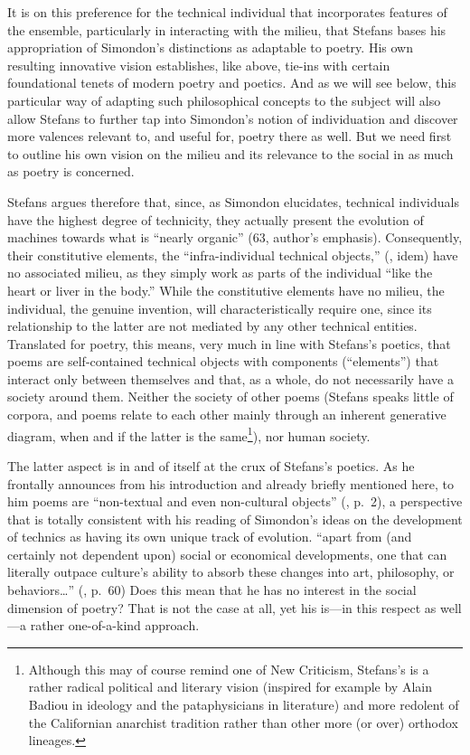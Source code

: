 It is on this preference for the technical individual that incorporates
features of the ensemble, particularly in interacting with the milieu,
that Stefans bases his appropriation of Simondon's distinctions as
adaptable to poetry. His own resulting innovative vision establishes,
like above, tie-ins with certain foundational tenets of modern poetry
and poetics. And as we will see below, this particular way of adapting
such philosophical concepts to the subject will also allow Stefans to
further tap into Simondon's notion of individuation and discover more
valences relevant to, and useful for, poetry there as well. But we need
first to outline his own vision on the milieu and its relevance to the
social in as much as poetry is concerned.

Stefans argues therefore that, since, as Simondon elucidates, technical
individuals have the highest degree of technicity, they actually present
the evolution of machines towards what is ``nearly organic'' (63,
author's emphasis). Consequently, their constitutive elements, the
``{i}nfra-individual technical objects,'' (\cite{stefans2017word},
idem) have no associated milieu, as they simply work as parts of the
individual ``like the heart or liver in the body.'' While the
constitutive elements have no milieu, the individual, the genuine
invention, will characteristically require one, since its relationship
to the latter are not mediated by any other technical entities.
Translated for poetry, this means, very much in line with Stefans's
poetics, that poems are self-contained technical objects with components
(``elements'') that interact only between themselves and that, as a
whole, do not necessarily have a society around them. Neither the
society of other poems (Stefans speaks little of corpora, and poems
relate to each other mainly through an inherent generative diagram, when
and if the latter is the same\footnote{Although this may of course
  remind one of New Criticism, Stefans's is a rather radical political
  and literary vision (inspired for example by Alain Badiou in ideology
  and the pataphysicians in literature) and more redolent of the
  Californian anarchist tradition rather than other more (or over)
  orthodox lineages.}), nor human society.

The latter aspect is in and of itself at the crux of Stefans's poetics.
As he frontally announces from his introduction and already briefly
mentioned here, to him poems are ``non-textual and even non-cultural
objects'' (\cite{stefans2017word}, p.~2), a perspective that is totally
consistent with his reading of Simondon's ideas on the development of
technics as having its own unique track of evolution. ``apart from (and
certainly not dependent upon) social or economical developments, one
that can literally outpace culture's ability to absorb these changes
into art, philosophy, or behaviors\ldots{}'' (\cite{stefans2017word},
p.~60) Does this mean that he has no interest in the social dimension of
poetry? That is not the case at all, yet his is---in this respect as
well---a rather one-of-a-kind approach.

